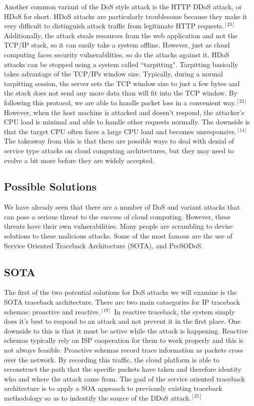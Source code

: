 \documentclass[a4paper, 8pt]{article} %
\begin{document}
\begin{doublespacing}
Another common variant of the DoS style attack is the HTTP DDoS attack, or HDoS for short.  HDoS attacks are particularly troublesome because they make it very difficult to distinguish attack traffic from legitimate HTTP requests.$^{[23]}$  Additionally, the attack steals resources from the web application and not the TCP/IP stack, so it can easily take a system offline.  However, just as cloud computing faces security vulnerabilities, so do the attacks against it.  HDoS attacks can be stopped using a system called ``tarpitting".  Tarpitting basically takes advantage of the TCP/IPs window size.  Typically, during a normal tarpitting session, the server sets the TCP window size to just a few bytes and the stack does not send any more data than will fit into the TCP window.  By following this protocol, we are able to handle packet loss in a convenient way.$^{[23]}$  However, when the host machine is attacked and doesn't respond, the attacker's CPU load is minimal and able to handle other requests normally.  The downside is that the target CPU often faces a large CPU load and becomes unresponsive.$^{[14]}$  The takeaway from this is that there are possible ways to deal with denial of service type attacks on cloud computing architectures, but they may need to evolve a bit more before they are widely accepted.  

\subsection*{Possible Solutions}

We have already seen that there are a number of DoS and variant attacks that can pose a serious threat to the success of cloud computing.  However, these threats have their own vulnerabilities.  Many people are scrambling to devise solutions to these malicious attacks.  Some of the most famous are the use of Service Oriented Traceback Architecture (SOTA), and PreSODoS.  

\subsection*{SOTA}

The first of the two potential solutions for DoS attacks we will examine is the SOTA traceback architecture.  There are two main cataegories for IP traceback schemas: proactive and reactive.$^{[19]}$  In reactive traceback, the system simply does it's best to respond to an attack and not prevent it in the first place.  One downside to this is that it must be active while the attack is happening.  Reactive schemas typically rely on ISP cooperation for them to work properly and this is not always feasible.  Proactive schemas record trace information as packets cross over the network.  By recording this traffic, the cloud platform is able to reconstruct the path that the specific packets have taken and therefore identity who and where the attack came from.  The goal of the service oriented traceback architecture is to apply a SOA approach to previously existing traceback methodology so as to indentify the source of the DDoS attack.$^{[25]}$  


\end{doublespacing}
\end{document}
